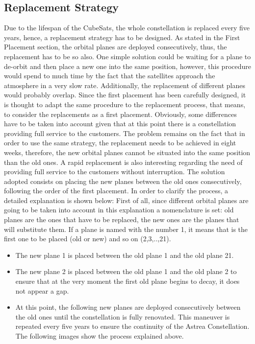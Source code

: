 \subsection{Replacement Strategy}
Due to the lifespan of the CubeSats, the whole constellation is replaced every five years, hence, a replacement strategy has to be designed. As stated in the First Placement section, the orbital planes are deployed consecutively, thus, the replacement has to be so also. One simple solution could be waiting for a plane to de-orbit and then place a new one into the same position, however, this procedure would spend to much time by the fact that the satellites approach the atmosphere in a very slow rate. Additionally, the replacement of different planes would probably overlap. Since the first placement has been carefully designed, it is thought to adapt the same procedure to the replacement process, that means, to consider the replacements as a first placement. Obviously, some differences have to be taken into account given that at this point there is a constellation providing full service to the customers. The problem remains on the fact that in order to use the same strategy, the replacement needs to be achieved in eight weeks, therefore, the new orbital planes cannot be situated into the same position than the old ones. A rapid replacement is also interesting regarding the need of providing full service to the customers without interruption. The solution adopted consists on placing the new planes between the old ones consecutively, following the order of the first placement. In order to clarify the process, a detailed explanation is shown below:
\newline
First of all, since different orbital planes are going to be taken into account in this explanation a nomenclature is set: old planes are the ones that have to be replaced, the new ones are the planes that will substitute them. If a plane is named with the number 1, it means that is the first one to be placed (old or new) and so on (2,3,..,21). 
\begin{itemize}
\item The new plane 1 is placed between the old plane 1 and the old plane 21.
\item The new plane 2 is placed between the old plane 1 and the old plane 2 to ensure that at the very moment the first old plane begins to decay, it does not appear a gap.
\item At this point, the following new planes are deployed consecutively between the old ones until the constellation is fully renovated. This maneuver is repeated every five years to ensure the continuity of the Astrea Constellation. 
The following images show the process explained above.
\end{itemize}
